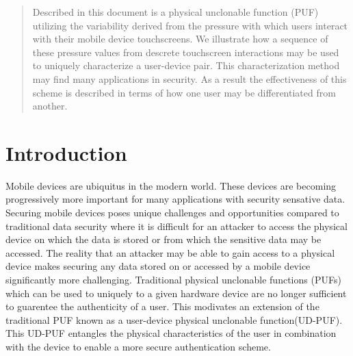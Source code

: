 \documentclass{acm_proc_article-sp}
\begin{document}

\maketitle
\begin{abstract}
Described in this document is a physical unclonable function (PUF) utilizing the variability derived from the pressure with which users interact with their mobile device touchscreens. We illustrate how a sequence of these pressure values from descrete touchscreen interactions may be used to uniquely characterize a user-device pair. This characterization method may find many applications in security. As a result the effectiveness of this scheme is described in terms of how one user may be differentiated from another.
\end{abstract}




\section{Introduction}
\label{sec:intro}
Mobile devices are ubiquitus in the modern world. These devices are becoming progressively more important for many applications with security sensative data. 
Securing mobile devices poses unique challenges and opportunities compared to traditional data security where it is difficult for an attacker to access the physical device on which the data is stored or from which the sensitive data may be accessed.
%
The reality that an attacker may be able to gain access to a physical device makes securing any data stored on or accessed by a mobile device significantly more challenging. Traditional physical unclonable functions (PUFs) which can be used to uniquely to a given hardware device are no longer sufficient to guarentee the authenticity of a user.
%
This modivates an extension of the traditional PUF known as a user-device physical unclonable function(UD-PUF). This UD-PUF entangles the physical characteristics of the user in combination with the device to enable a more secure authentication scheme.
\end{document}
